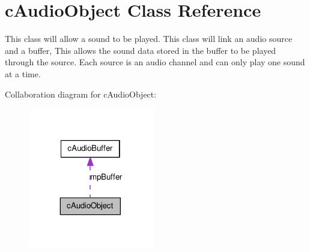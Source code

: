 \hypertarget{classc_audio_object}{
\section{cAudioObject Class Reference}
\label{classc_audio_object}
}


This class will allow a sound to be played. This class will link an audio source and a buffer, This allows the sound data stored in the buffer to be played through the source. Each source is an audio channel and can only play one sound at a time.  




Collaboration diagram for cAudioObject:
\nopagebreak
\begin{figure}[H]
\begin{center}
\leavevmode
\includegraphics[width=157pt]{classc_audio_object__coll__graph}
\end{center}
\end{figure}
